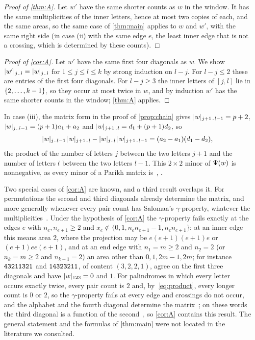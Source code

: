 \documentclass[11pt,a4paper]{article}
\begin{document}
\begin{proof}[Proof of \cref{thm:A}]
Let $w'$ have the same shorter counts as $w$ in the window. It has the same multiplicities of the inner letters, hence at most two copies of each, and the same areas, so the same case of \cref{thm:main} applies to $w$ and $w'$, with the same right side (in case (ii) with the same edge $e$, the least inner edge that is not a crossing, which is determined by these counts).
\end{proof}

\begin{proof}[Proof of \cref{cor:A}]
Let $w'$ have the same first four diagonals as $w$. We show $\lvert w'\rvert_{j\mathinner{\ldotp\ldotp} l}=\lvert w\rvert_{j\mathinner{\ldotp\ldotp} l}$ for $1\le j\le l\le k$ by strong induction on $l-j$. For $l-j\le2$ these are entries of the first four diagonals. For $l-j\ge3$ the inner letters of $[j,l]$ lie in $\{2,\ldots,k-1\}$, so they occur at most twice in $w$, and by induction $w'$ has the same shorter counts in the window; \cref{thm:A} applies.
\end{proof}

\begin{remark}\label{rem:minor}
In case (iii), the matrix form in the proof of \cref{prop:chain} gives $\lvert w\rvert_{j+1\mathinner{\ldotp\ldotp} l-1}=p+2$, $\lvert w\rvert_{j\mathinner{\ldotp\ldotp} l-1}=(p+1)a_1+a_2$ and $\lvert w\rvert_{j+1\mathinner{\ldotp\ldotp} l}=d_1+(p+1)d_2$, so
\[
\lvert w\rvert_{j\mathinner{\ldotp\ldotp} l-1}\,\lvert w\rvert_{j+1\mathinner{\ldotp\ldotp} l}-\lvert w\rvert_{j\mathinner{\ldotp\ldotp} l}\,\lvert w\rvert_{j+1\mathinner{\ldotp\ldotp} l-1}=(a_2-a_1)(d_1-d_2),
\]
the product of the number of letters $j$ between the two letters $j+1$ and the number of letters $l$ between the two letters $l-1$. This $2\times2$ minor of $\Psi(w)$ is nonnegative, as every minor of a Parikh matrix is~\cite[Theorem~6, p.~12]{MSY04}, \cite[Theorem~6, p.~196]{Sal05}.
\end{remark}

\begin{remark}\label{rem:known}
Two special cases of \cref{cor:A} are known, and a third result overlaps it. For permutations the second and third diagonals already determine the matrix, and more generally whenever every pair count has Salomaa's $\gamma$-property, whatever the multiplicities~\cite[Theorem~3, p.~226]{Sal06}. Under the hypothesis of \cref{cor:A} the $\gamma$-property fails exactly at the edges $e$ with $n_e,n_{e+1}\ge2$ and $x_e\notin\{0,1,n_en_{e+1}-1,n_en_{e+1}\}$: at an inner edge this means area $2$, where the projection may be $e(e+1)(e+1)e$ or $(e+1)ee(e+1)$, and at an end edge with $n_1=m\ge2$ and $n_2=2$ (or $n_k=m\ge2$ and $n_{k-1}=2$) an area other than $0,1,2m-1,2m$; for instance $\mathtt{43211321}$ and $\mathtt{14323211}$, of content $(3,2,2,1)$, agree on the first three diagonals and have $\lvert w\rvert_{123}=0$ and $1$. For palindromes in which every letter occurs exactly twice, every pair count is $2$ and, by~\eqref{eq:product}, every longer count is $0$ or $2$, so the $\gamma$-property fails at every edge and crossings do not occur, and the alphabet and the fourth diagonal determine the matrix~\cite[Theorem~3, Corollary~4, p.~331]{Sim20}; on these words the third diagonal is a function of the second~\cite[Theorem~3(b)]{Sim20}, so \cref{cor:A} contains this result. The general statement and the formulas of \cref{thm:main} were not located in the literature we consulted.
\end{remark}
\end{document}
